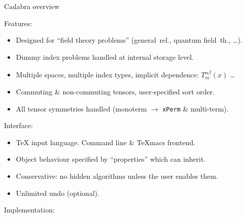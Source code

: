 \documentclass{beamer}
\newcommand{\Cpp}{{\leavevmode\rm{\hbox{C\hskip -0.1ex\raise
		  0.5ex\hbox{\tiny ++}}}}\xspace}
\newcommand{\Blue}[1]{{\color[named]{Blue} #1}}
\begin{document}
\begin{frame}{Cadabra overview\hspace{.52\textwidth}}
\medskip

\Blue{Features}:
\begin{small}\begin{itemize}\setlength{\itemsep}{-2pt}
\item Designed for ``field theory problems'' {\scriptsize (general~rel., quantum field~th., \ldots)}.
\item Dummy index problems handled at internal storage level.
\item Multiple spaces, multiple index types, implicit dependence: $T^{\alpha \dot{\beta}}_{m}(x)$ \ldots
\item Commuting \& non-commuting tensors, user-specified sort order.
\item All tensor symmetries handled (monoterm $\rightarrow$ {\tt xPerm} \& multi-term).
\end{itemize}\end{small}
\medskip

\Blue{Interface}:
\begin{small}\begin{itemize}\setlength{\itemsep}{-2pt}
\item {\rm \TeX} input language. Command line \& TeXmacs
  frontend.
\item Object behaviour specified by ``properties'' which can inherit.
\item Conservative: no hidden algorithms unless the user enables them.
\item Unlimited undo (optional).
\end{itemize}\end{small}
\medskip

\Blue{Implementation}:
\begin{small}\end{small}


\end{frame}
\end{document}
